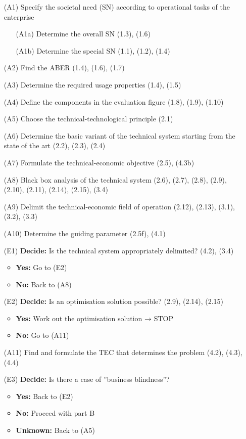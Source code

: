 \documentclass[12pt,a4paper]{article}
\begin{document}
\begin{itemize}[leftmargin=35pt,align=left]
\item[(A1)] Specify the societal need (SN) according to operational tasks of
  the enterprise
  \begin{itemize}[leftmargin=20pt]
  \item[(A1a)] Determine the overall SN (1.3), (1.6)
  \item[(A1b)] Determine the special SN (1.1), (1.2), (1.4)
  \end{itemize}
\item[(A2)] Find the ABER (1.4), (1.6), (1.7)
\item[(A3)] Determine the required usage properties (1.4), (1.5)
\item[(A4)] Define the components in the evaluation figure (1.8), (1.9),
  (1.10)
\item[(A5)] Choose the technical-technological principle (2.1)
\item[(A6)] Determine the basic variant of the technical system starting from
  the state of the art (2.2), (2.3), (2.4)
\item[(A7)] Formulate the technical-economic objective (2.5), (4.3b)
\item[(A8)] Black box analysis of the technical system (2.6), (2.7), (2.8),
  (2.9), (2.10), (2.11), (2.14), (2.15), (3.4)
\item[(A9)] Delimit the technical-economic field of operation (2.12), (2.13),
  (3.1), (3.2), (3.3)
\item[(A10)] Determine the guiding parameter (2.5f), (4.1)
\item[(E1)] \textbf{Decide:} Is the technical system appropriately delimited?
  (4.2), (3.4)
  \begin{itemize}[leftmargin=20pt]
  \item \textbf{Yes:} Go to (E2)
  \item \textbf{No:} Back to (A8)
  \end{itemize}
\item[(E2)] \textbf{Decide:} Is an optimisation solution possible? (2.9),
  (2.14), (2.15)
  \begin{itemize}[leftmargin=20pt]
  \item \textbf{Yes:} Work out the optimisation solution → STOP
  \item \textbf{No:} Go to (A11)
  \end{itemize}
\item[(A11)] Find and formulate the TEC that determines the problem (4.2),
  (4.3), (4.4)
\item[(E3)] \textbf{Decide:} Is there a case of ”business blindness”?
  \begin{itemize}[leftmargin=20pt]
  \item \textbf{Yes:} Back to (E2)
  \item \textbf{No:} Proceed with part B
  \item \textbf{Unknown:} Back to (A5)
  \end{itemize}
\end{itemize}
\newpage
\end{document}
